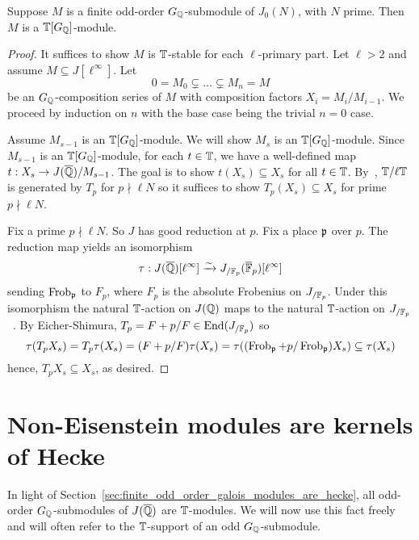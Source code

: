 \documentclass[11pt, proquest]{uwthesis}
\begin{document}
\begin{theorem}\label{thm:G_modules_are_Hecke}
    Suppose $M$ is a finite odd-order $G_{\mathbb{Q}}$-submodule of $J_0(N)$, with $N$
    prime. Then $M$ is a $\mathbb{T}[G_{\mathbb{Q}}]$-module.
\end{theorem}
\begin{proof}
    It suffices to show $M$ is $\mathbb{T}$-stable for each $\ell$-primary part. Let
    $\ell>2$ and assume $M\subseteq J[\ell^\infty]$. Let
    \[
        0 = M_0 \subsetneq \ldots \subsetneq M_n = M
    \]
    be an $G_{\mathbb{Q}}$-composition series of $M$ with composition factors $X_i =
    M_i/M_{i-1}$. We proceed by induction on $n$ with the base
    case being the trivial $n=0$ case.

    Assume $M_{s-1}$ is an $\mathbb{T}[G_{\mathbb{Q}}]$-module. We will show $M_s$ is an
    $\mathbb{T}[G_{\mathbb{Q}}]$-module. Since $M_{s-1}$ is an $\mathbb{T}[G_{\mathbb{Q}}]$-module, for each
    $t\in \mathbb{T}$, we have a well-defined map $t:X_s\to J(\overline{\mathbb{Q}})/M_{s-1}$. The
    goal is to show $t(X_s)\subseteq X_s$ for all $t\in \mathbb{T}$.
    By~\cite[Proposition 2]{ribet:mult_p_finite}, $\mathbb{T}/\ell \mathbb{T}$ is generated
    by $T_p$ for $p\nmid \ell N$ so it suffices to show $T_p(X_s)\subseteq X_s$
    for prime $p\nmid \ell N$.

    Fix a prime $p\nmid \ell N$. So $J$ has good reduction at $p$. Fix a place
    $\mathfrak{p}$ over $p$. The reduction map
    yields an isomorphism~\cite[Theorem 1, Lemma 2]{serre-tate}
    \[
        \tau:J(\overline{\mathbb{Q}})[\ell^\infty] \xrightarrow{\sim} J_{/\mathbb{F}_p} (\overline{\mathbb{F}}_p)[\ell^\infty]
    \]
    sending $\operatorname{Frob}_{\mathfrak{p}}$ to $F_p$, where $F_p$ is the absolute Frobenius on
    $J_{/\mathbb{F}_p}$. Under this isomorphism the natural $\mathbb{T}$-action on $J(\mathbb{Q})$
    maps to the natural $\mathbb{T}$-action on $J_{/\mathbb{F}_p}$~\cite[\S
    5.2]{ribet-stein:serre}. By Eicher-Shimura, $T_p = F+p/F\in
    \operatorname{End}(J_{/\mathbb{F}_p})$ so
    \[
        \tau(T_p X_s)
        = T_p\tau(X_s)
        = (F+p/F)\tau(X_s)
        = \tau((\operatorname{Frob}_{\mathfrak{p}}+p/\operatorname{Frob}_{\mathfrak{p}})X_s)
        \subseteq \tau(X_s)
    \]
    hence, $T_p X_s\subseteq X_s$, as desired.
\end{proof}


\section{Non-Eisenstein modules are kernels of Hecke}%
\label{sec:non_eisenstein_modules_are_kernels_of_hecke}

In light of Section~\ref{sec:finite_odd_order_galois_modules_are_hecke}, all
odd-order $G_{\mathbb{Q}}$-submodules of $J(\overline{\mathbb{Q}})$ are $\mathbb{T}$-modules. We will now
use this fact freely and will often refer to the $\mathbb{T}$-support of an odd
$G_{\mathbb{Q}}$-submodule.
\end{document}
